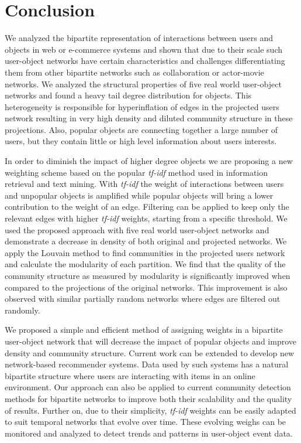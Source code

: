 
\section{Conclusion}

We analyzed the bipartite representation of interactions between users and
objects in web or e-commerce systems and shown that due to their scale such
user-object networks have certain characteristics and challenges differentiating
them from other bipartite networks such as collaboration or actor-movie
networks. We analyzed the structural properties of five real world user-object
networks and found a heavy tail degree distribution for objects. This
heterogeneity is responsible for hyperinflation of edges in the projected users
network resulting in very high density and diluted community structure in these
projections. Also, popular objects are connecting together a large number of
users, but they contain little or high level information about users interests.

In order to diminish the impact of higher degree objects we are proposing a new
weighting scheme based on the popular \emph{tf-idf} method used in information
retrieval and text mining. With \emph{tf-idf} the weight of interactions between
users and unpopular objects is amplified while popular objects will bring a
lower contribution to the weight of an edge. Filtering can be applied to keep
only the relevant edges with higher \emph{tf-idf} weights, starting from a
specific threshold. We used the proposed approach with five real world user-object
networks and demonstrate a decrease in density of both original and projected
networks.  We apply the Louvain method \citep{blondel2008fast} to find
communities in the projected users network and calculate the modularity of each
partition. We find that the quality of the community structure as measured by
modularity is significantly improved when compared to the projections of the
original networks. This improvement is also observed with similar partially
random networks where edges are filtered out randomly.
 
We proposed a simple and efficient method of assigning weights in a bipartite
user-object network that will decrease the impact of popular objects and improve
density and community structure. Current work can be extended to develop new
network-based recommender systems. Data used by such systems has a natural
bipartite structure where users are interacting with items in an online
environment. Our approach can also be applied to current community detection
methods for bipartite networks to improve both their scalability and the quality
of results. Further on, due to their simplicity, \emph{tf-idf} weights can be
easily adapted to suit temporal networks that evolve over time. These evolving
weighs can be monitored and analyzed to detect trends and patterns in
user-object event data.
